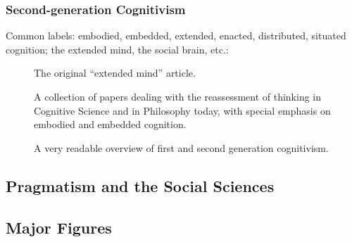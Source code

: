 \documentclass[11pt,twoside]{article}
\begin{document}
\begin{appendices}
\subsubsection{Second-generation Cognitivism}

Common labels: embodied, embedded, extended, enacted, distributed,
situated cognition; the extended mind, the social brain, etc.:

\begin{description}
\item [\cite{adams_embodied_2010}]
\item [\cite{cash_cognition_2013}]
\item [\cite{clark_being_1997}]
\item [\cite{clark_extended_1998}]  The original ``extended mind'' article.
\item [\cite{dunbar_social_1998}]
\item [\cite{ignatow_theories_2007}]
\item [\cite{kono_extended_2010}]
\item [\cite{leidlmair_after_2009}]  A collection of papers dealing with the reassessment of thinking in Cognitive Science and in Philosophy today, with special emphasis on embodied and embedded cognition.
\item [\cite{varela_embodied_1992}]
\item [\cite{walter_situated_2013}]  A very readable overview of first and second generation cognitivism.
\item [\cite{wilson_six_2002}]
\end{description}

\subsection{Pragmatism and the Social Sciences}
\begin{description}
\item [\cite{baert_towards_2005}]
\item [\cite{baert_philosophy_2005}]
\item [\cite{emirbayer_pragmatism_2010}]
\item [\cite{kivinen_relevance_2004}]
\item [\cite{kivinen_sociologizing_2007}]
\item [\cite{wolfe_pragmatic_revival_1998}]
\end{description}

\subsection{Major Figures}

\end{appendices}
\end{document}
